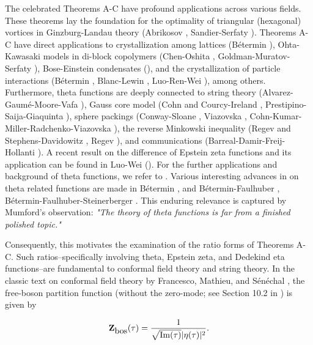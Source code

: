 \documentclass[reqno,english]{amsart}
\newtheorem{open problem}{Open Problem}[section]
\newtheorem{open question}{Open Question}[section]
\newtheorem{open questions on hexagonal lattice}{Open Questions on hexagonal lattice}[section]
\renewcommand{\Im}{\operatorname{Im}}
\begin{document}
The celebrated Theorems A-C have profound applications across various fields. These theorems lay the foundation for the optimality of triangular (hexagonal) vortices in Ginzburg-Landau theory (Abrikosov \cite{Abr}, Sandier-Serfaty \cite{Serfaty2012,Serfaty2018}).
Theorems A-C have direct applications to crystallization among lattices (B\'etermin \cite{Bet2016}), Ohta-Kawasaki models in di-block copolymers (Chen-Oshita \cite{Che2007}, Goldman-Muratov-Serfaty \cite{GMS2013}), Bose-Einstein condensates (\cite{Ho2001}), and the crystallization of particle interactions (B\'etermin \cite{Bet2019,Betermin2021JPA,Betermin2021AHP,Betermin2021a}, Blanc-Lewin \cite{Bla2015}, Luo-Ren-Wei \cite{Luo2019}), among others.
Furthermore, theta functions  are deeply connected to string theory (Alvarez-Gaum\'e-Moore-Vafa \cite{Vafa1986}),
 Gauss core model  (Cohn and Courcy-Ireland \cite{Cohn2018},
  Prestipino-Saija-Giaquinta \cite{Pres2011}), sphere packings (Conway-Sloane \cite{Conway},
   Viazovska \cite{Via2017}, Cohn-Kumar-Miller-Radchenko-Viazovska \cite{Coh2017}),
 the reverse Minkowski inequality (Regev and Stephens-Davidowitz \cite{Regev2024}, Regev \cite{Regev2023}), and
  communications (Barreal-Damir-Freij-Hollanti \cite{Bar2020}). A recent result on the difference of Epstein zeta functions and its application can be found in Luo-Wei (\cite{LW2025}). For the further applications and background of theta functions, we refer to \cite{Betermin2020CA,Betermin2023JAM,Betermin2021bb,Kramer1991}. Various
interesting advances in on theta related functions are made in B\'etermin \cite{Betermin2020CA,Betermin2021SIAM}, and B\'etermin-Faulhuber \cite{Betermin2023JAM}, B\'etermin-Faulhuber-Steinerberger \cite{Betermin2021bb}.
This enduring relevance is captured by Mumford's \cite{Mumford1983} observation: {\em "The theory of theta functions is far from a finished polished topic."}

Consequently, this motivates the examination of the ratio forms of Theorems A-C. Such ratios--specifically involving theta, Epstein zeta, and Dedekind eta functions--are fundamental to conformal field theory and string theory. In the classic text on conformal field theory by Francesco, Mathieu, and S\'en\'echal \cite{Fran1997}, the free-boson partition function (without the zero-mode; see Section 10.2 in \cite{Fran1997}) is given by
 
\begin{equation}\aligned\label{etap}
\mathbf{Z}_{\hbox{bos}}(\tau)=\frac{1}{\sqrt{\Im(\tau)}|\eta(\tau)|^2}.
\endaligned\end{equation}
\end{document}
